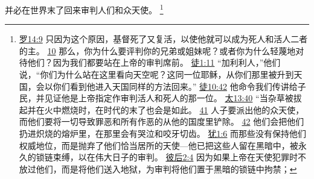 \documentclass[12pt, a4paper, oneside]{ctexart}
\begin{document}
	并必在世界末了回来审判人们和众天使。
	\footnote {
		\href{https://biblehub.com/romans/14-9.htm}{罗14:9} 只因为这个原因，基督死了又复活，以使他就可以成为死人和活人二者的主。
		\href{https://biblehub.com/romans/14-10.htm}{10} 那么，你为什么要评判你的兄弟或姐妹呢？或者你为什么轻蔑地对待他们？因为我们都要站在上帝的审判席前。
		\href{https://biblehub.com/acts/1-11.htm}{徒1:11} “加利利人，”他们说，“你们为什么站在这里看向天空呢？这同一位耶稣，从你们那里被升到天国，会以你们看到他进入天国同样的方法回来。”
		\href{https://biblehub.com/acts/10-42.htm}{徒10:42} 他命令我们传讲给子民，并见证他是上帝指定作审判活人和死人的那一位。
		\href{https://biblehub.com/matthew/13-40.htm}{太13:40} “当杂草被拔起并在火中燃烧时，在时代的末了也会是如此。
		\href{https://biblehub.com/matthew/13-41.htm}{41} 人子要派出他的众天使，而他们要将一切导致罪恶和所有作恶的从他的国度里铲除。
		\href{https://biblehub.com/matthew/13-42.htm}{42} 他们会把他们扔进炽烧的熔炉里，在那里会有哭泣和咬牙切齿。
		\href{https://biblehub.com/jude/1-6.htm}{犹1:6} 而那些没有保持他们权威地位，而是抛弃了他们恰当居所的天使---他已把这些人留在黑暗中，被永久的锁链束缚，以在伟大日子的审判。
		\href{https://biblehub.com/2_peter/2-4.htm}{彼后2:4} 因为如果上帝在天使犯罪时不放过他们，而是将他们送入地狱，为审判将他们置于黑暗的锁链中拘禁；
	}
\end{document}
